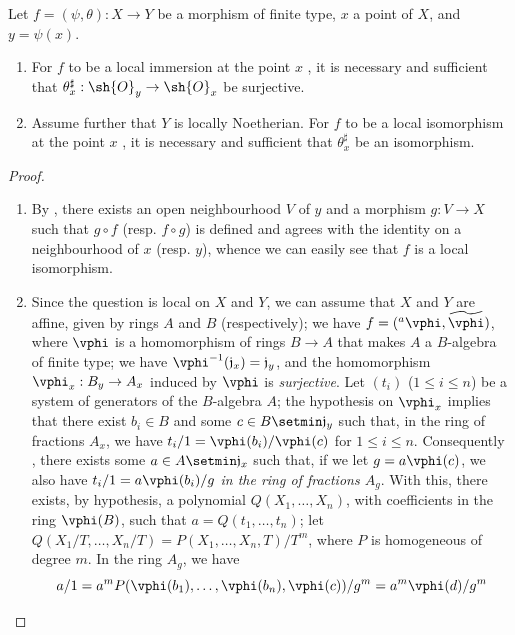 \begin{proposition}[6.5.4]
\label{I.6.5.4}
Let $f=(\psi,\theta):X\to Y$ be a morphism of finite type, $x$ a point of $X$, and $y=\psi(x)$.
\begin{enumerate}
  \item[{\rm(i)}] For $f$ to be a local immersion at the point $x$ , it is necessary and sufficient that $\theta_x^\sharp:\sh{O}_y\to\sh{O}_x$ be surjective.
  \item[{\rm(ii)}] Assume further that $Y$ is locally Noetherian.
    For $f$ to be a local isomorphism at the point $x$ , it is necessary and sufficient that $\theta_x^\sharp$ be an isomorphism.
\end{enumerate}
\end{proposition}

\begin{proof}
\medskip\noindent
\begin{enumerate}
  \item[(ii)] By , there exists an open neighbourhood $V$ of $y$ and a morphism $g:V\to X$ such that $g\circ f$ (resp. $f\circ g$) is defined and agrees with the identity on a neighbourhood of $x$ (resp. $y$), whence we can easily see that $f$ is a local isomorphism.
  \item[(i)] Since the question is local on $X$ and $Y$, we can assume that $X$ and $Y$ are affine, given by rings $A$ and $B$ (respectively);
    we have $f=({}^a\vphi,\widetilde{\vphi})$, where $\vphi$ is a homomorphism of rings $B\to A$ that makes $A$ a $B$-algebra of finite type;
    we have $\vphi^{-1}(\mathfrak{j}_x)=\mathfrak{j}_y$, and the homomorphism $\vphi_x:B_y\to A_x$ induced by $\vphi$ is \emph{surjective}.
    Let $(t_i)$ ($1\leq i\leq n$) be a system of generators of the $B$-algebra $A$;
    the hypothesis on $\vphi_x$ implies that there exist $b_i\in B$ and some $c\in B\setmin\mathfrak{j}_y$ such that, in the ring of fractions $A_x$, we have $t_i/1=\vphi(b_i)/\vphi(c)$ for $1\leq i\leq n$.
    Consequently , there exists some $a\in A\setmin\mathfrak{j}_x$ such that, if we let $g=a\vphi(c)$, we also have $t_i/1=a\vphi(b_i)/g$ \emph{in the ring of fractions $A_g$}.
    With this, there exists, by hypothesis, a polynomial $Q(X_1,\ldots,X_n)$, with coefficients in the ring $\vphi(B)$,
    such that $a=Q(t_1,\ldots,t_n)$;
    let $Q(X_1/T,\ldots,X_n/T)=P(X_1,\ldots,X_n,T)/T^m$, where $P$ is homogeneous of degree $m$.
    In the ring $A_g$, we have
    \[
      a/1=a^mP(\vphi(b_1),\ldots,\vphi(b_n),\vphi(c))/g^m=a^m\vphi(d)/g^m
\]
\end{enumerate}
\end{proof}
